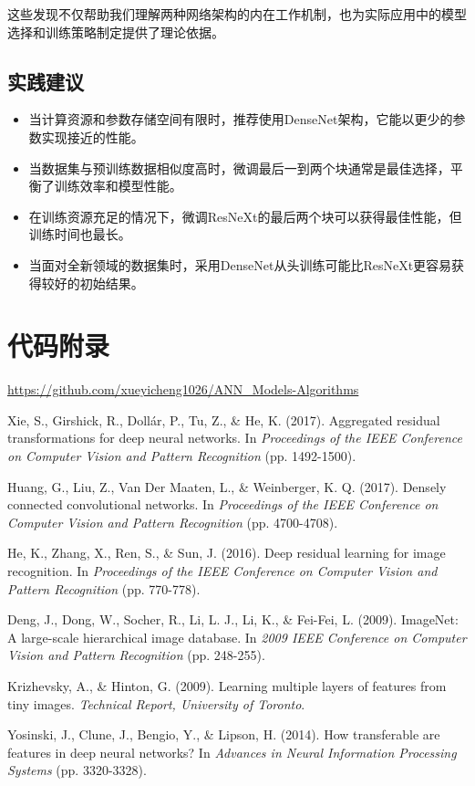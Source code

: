 \documentclass[a4paper,10pt,twocolumn]{article}
\begin{document}
这些发现不仅帮助我们理解两种网络架构的内在工作机制，也为实际应用中的模型选择和训练策略制定提供了理论依据。

\subsection{实践建议}
\begin{itemize}
    \item 当计算资源和参数存储空间有限时，推荐使用DenseNet架构，它能以更少的参数实现接近的性能。
    \item 当数据集与预训练数据相似度高时，微调最后一到两个块通常是最佳选择，平衡了训练效率和模型性能。
    \item 在训练资源充足的情况下，微调ResNeXt的最后两个块可以获得最佳性能，但训练时间也最长。
    \item 当面对全新领域的数据集时，采用DenseNet从头训练可能比ResNeXt更容易获得较好的初始结果。
\end{itemize}

\section{代码附录}
\url{https://github.com/xueyicheng1026/ANN_Models-Algorithms}

\begin{thebibliography}{99}

Xie, S., Girshick, R., Dollár, P., Tu, Z., \& He, K. (2017). Aggregated residual transformations for deep neural networks. In \textit{Proceedings of the IEEE Conference on Computer Vision and Pattern Recognition} (pp. 1492-1500).

Huang, G., Liu, Z., Van Der Maaten, L., \& Weinberger, K. Q. (2017). Densely connected convolutional networks. In \textit{Proceedings of the IEEE Conference on Computer Vision and Pattern Recognition} (pp. 4700-4708).

He, K., Zhang, X., Ren, S., \& Sun, J. (2016). Deep residual learning for image recognition. In \textit{Proceedings of the IEEE Conference on Computer Vision and Pattern Recognition} (pp. 770-778).

Deng, J., Dong, W., Socher, R., Li, L. J., Li, K., \& Fei-Fei, L. (2009). ImageNet: A large-scale hierarchical image database. In \textit{2009 IEEE Conference on Computer Vision and Pattern Recognition} (pp. 248-255).

Krizhevsky, A., \& Hinton, G. (2009). Learning multiple layers of features from tiny images. \textit{Technical Report, University of Toronto}.

Yosinski, J., Clune, J., Bengio, Y., \& Lipson, H. (2014). How transferable are features in deep neural networks? In \textit{Advances in Neural Information Processing Systems} (pp. 3320-3328).

\end{thebibliography}
\end{document}

